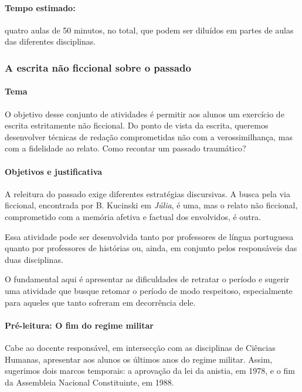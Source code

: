 \documentclass[12pt]{extarticle}
\begin{document}
\paragraph{Tempo estimado:} quatro aulas de 50 minutos, no total, que podem
ser diluídos em partes de aulas das diferentes disciplinas.

\subsubsection{A escrita não ficcional sobre o passado}


\paragraph{Tema}

O objetivo desse conjunto de atividades é permitir aos alunos um
exercício de escrita estritamente não ficcional. Do ponto de vista da
escrita, queremos desenvolver técnicas de redação comprometidas não com
a verossimilhança, mas com a fidelidade ao relato. Como recontar um
passado traumático?

\paragraph{Objetivos e justificativa}

A releitura do passado exige diferentes estratégias discursivas. A busca
pela via ficcional, encontrada por B. Kucinski em \emph{Júlia}, é uma,
mas o relato não ficcional, comprometido com a memória afetiva e factual
dos envolvidos, é outra.

Essa atividade pode ser desenvolvida tanto por professores de língua
portuguesa quanto por professores de histórias ou, ainda, em conjunto
pelos responsáveis das duas disciplinas.

O fundamental aqui é apresentar as dificuldades de retratar o período e
sugerir uma atividade que busque retomar o período de modo respeitoso,
especialmente para aqueles que tanto sofreram em decorrência dele.

\paragraph{Pré-leitura: O fim do regime militar}

Cabe ao docente responsável, em intersecção com as disciplinas de Ciências 
Humanas, apresentar aos alunos os
últimos anos do regime militar. Assim, sugerimos dois marcos temporais:
a aprovação da lei da anistia, em 1978, e o fim da Assembleia Nacional
Constituinte, em 1988.
\end{document}
